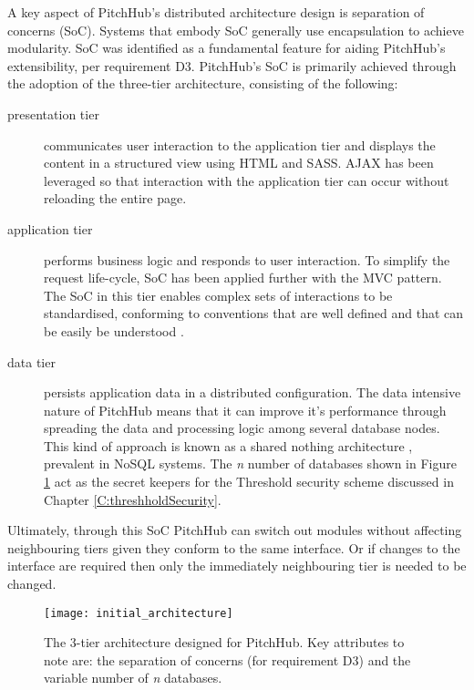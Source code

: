 A key aspect of PitchHub's distributed architecture design is separation of concerns (SoC). Systems that embody SoC generally use encapsulation to achieve modularity. SoC was identified as a fundamental feature for aiding PitchHub's extensibility, per requirement D3. PitchHub's SoC is primarily achieved through the adoption of the three-tier architecture, consisting of the following: 

\begin{description}
  \item[presentation tier] communicates user interaction to the application tier and displays the content in a structured view using HTML and SASS. AJAX has been leveraged so that interaction with the application tier can occur without reloading the entire page.
  \item[application tier] performs business logic and responds to user interaction. To simplify the request life-cycle, SoC has been applied further with the MVC pattern. The SoC in this tier enables complex sets of interactions to be standardised, conforming to conventions that are well defined and that can be easily be understood \cite{leff2001web}.
  \item[data tier] persists application data in a distributed configuration. The data intensive nature of PitchHub means that it can improve it's performance through spreading the data and processing logic among several database nodes. This kind of approach is known as a shared nothing architecture \cite{stonebraker1986case}, prevalent in NoSQL systems. The \textit{n} number of databases shown in Figure \ref{fig:architecture_1} act as the secret keepers for the Threshold security scheme discussed in Chapter \ref{C:threshholdSecurity}.
\end{description}

Ultimately, through this SoC PitchHub can switch out modules without affecting neighbouring tiers given they conform to the same interface. Or if changes to the interface are required then only the immediately neighbouring tier is needed to be changed. 

\begin{figure}[ht]
    \centering
    \texttt{[image: initial\_architecture]}
    \caption{The 3-tier architecture designed for PitchHub. Key attributes to note are: the separation of concerns (for requirement D3) and the variable number of \textit{n} databases.}
    \label{fig:architecture_1}
\end{figure}

